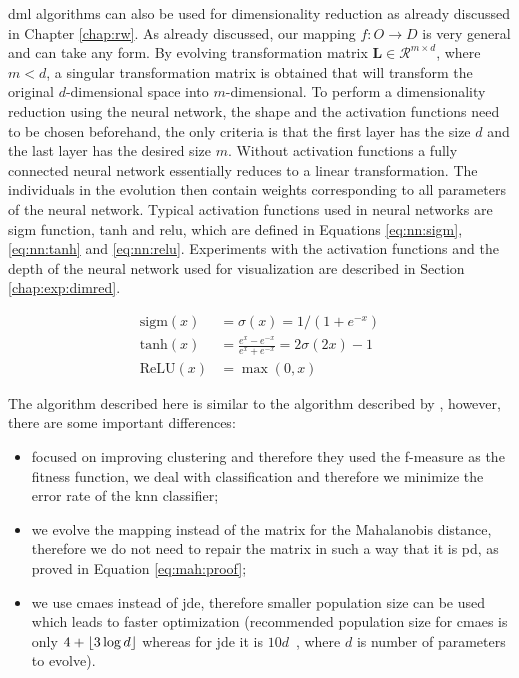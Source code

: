 \documentclass[12pt,a4paper]{report}
\begin{document}
\Acl{dml} algorithms can also be used for dimensionality reduction as already discussed in Chapter \ref{chap:rw}. As already discussed, our mapping $f: O \to D$ is very general and can take any form. By evolving transformation matrix $\bm{L} \in \mathcal{R}^{m\times d}$, where $m < d$, a singular transformation matrix is obtained that will transform the original $d$-dimensional space into $m$-dimensional. To perform a dimensionality reduction using the neural network, the shape and the activation functions need to be chosen beforehand, the only criteria is that the first layer has the size $d$ and the last layer has the desired size $m$. Without activation functions a fully connected neural network essentially reduces to a linear transformation. The individuals in the evolution then contain weights corresponding to all parameters of the neural network. Typical activation functions used in neural networks are \acf{sigm} function, \acf{tanh} and \acf{relu}, which are defined in Equations \ref{eq:nn:sigm}, \ref{eq:nn:tanh} and \ref{eq:nn:relu}. Experiments with the activation functions and the depth of the neural network used for visualization are described in Section \ref{chap:exp:dimred}.

\begin{align}
\text{sigm}(x) &= \sigma(x) = 1/(1+e^{-x}) \label{eq:nn:sigm} \\
\text{tanh}(x) &= \frac{e^x-e^{-x}}{e^x+e^{-x}} = 2\sigma(2x)-1 \label{eq:nn:tanh} \\
\text{ReLU}(x) &= \max(0,x) \label{eq:nn:relu}
\end{align}

The algorithm described here is similar to the algorithm described by \citep{fukui2013evolutionary}, however, there are some important differences:
\begin{itemize}
\item \citep{fukui2013evolutionary} focused on improving clustering and therefore they used the f-measure as the fitness function, we deal with classification and therefore we minimize the error rate of the \ac{knn} classifier;
\item we evolve the mapping instead of the matrix for the Mahalanobis distance, therefore we do not need to repair the matrix in such a way that it is \ac{pd}, as proved in Equation \ref{eq:mah:proof};
\item we use \ac{cmaes} instead of \ac{jde}, therefore smaller population size can be used which leads to faster optimization (recommended population size for \ac{cmaes} is only $4+\lfloor3\log{d}\rfloor$ \citep{hansen2006cma} whereas for \ac{jde} it is $10d$~\citep{brest2006self}, where $d$ is number of parameters to evolve).
\end{itemize}
\end{document}
